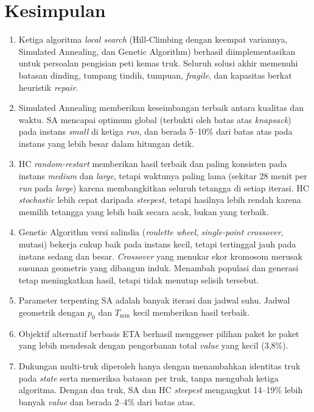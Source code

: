 \section{Kesimpulan}

\begin{enumerate}
	\item Ketiga algoritma \textit{local search} (Hill-Climbing dengan keempat variannya,
	Simulated Annealing, dan Genetic Algorithm) berhasil diimplementasikan untuk
	persoalan pengisian peti kemas truk. Seluruh solusi akhir memenuhi batasan dinding,
	tumpang tindih, tumpuan, \textit{fragile}, dan kapasitas berkat heuristik
	\textit{repair}.
	\item Simulated Annealing memberikan keseimbangan terbaik antara kualitas dan waktu.
	SA mencapai optimum global (terbukti oleh batas atas \textit{knapsack}) pada instans
	\textit{small} di ketiga \textit{run}, dan berada 5--10\% dari batas atas pada
	instans yang lebih besar dalam hitungan detik.
	\item HC \textit{random-restart} memberikan hasil terbaik dan paling konsisten pada
	instans \textit{medium} dan \textit{large}, tetapi waktunya paling lama (sekitar 28
	menit per \textit{run} pada \textit{large}) karena membangkitkan seluruh tetangga di
	setiap iterasi. HC \textit{stochastic} lebih cepat daripada \textit{steepest}, tetapi
	hasilnya lebih rendah karena memilih tetangga yang lebih baik secara acak, bukan yang
	terbaik.
	\item Genetic Algorithm versi salindia (\textit{roulette wheel}, \textit{single-point
	crossover}, mutasi) bekerja cukup baik pada instans kecil, tetapi tertinggal jauh pada
	instans sedang dan besar. \textit{Crossover} yang menukar ekor kromosom merusak susunan
	geometris yang dibangun induk. Menambah populasi dan generasi tetap meningkatkan
	hasil, tetapi tidak menutup selisih tersebut.
	\item Parameter terpenting SA adalah banyak iterasi dan jadwal suhu. Jadwal geometrik
	dengan $p_0$ dan $T_{\min}$ kecil memberikan hasil terbaik.
	\item Objektif alternatif berbasis ETA berhasil menggeser pilihan paket ke paket yang
	lebih mendesak dengan pengorbanan total \textit{value} yang kecil (3,8\%).
	\item Dukungan multi-truk diperoleh hanya dengan menambahkan identitas truk pada
	\textit{state} serta memeriksa batasan per truk, tanpa mengubah ketiga algoritma.
	Dengan dua truk, SA dan HC \textit{steepest} mengangkut 14--19\% lebih banyak
	\textit{value} dan berada 2--4\% dari batas atas.
\end{enumerate}

